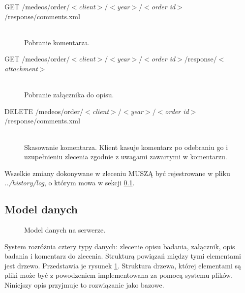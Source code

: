 \documentclass[a4paper]{article}
\begin{document}
\begin{description}
  \item[GET /medeos/order/$<$\emph{client}$>$/$<$\emph{year}$>$/$<$\emph{order id}$>$/response/comments.xml] \hfill \\
  Pobranie komentarza.
  \item[GET /medeos/order/$<$\emph{client}$>$/$<$\emph{year}$>$/$<$\emph{order id}$>$/response/$<$\emph{attachment}$>$] \hfill \\ 
  Pobranie załącznika do opisu.
  \item[DELETE /medeos/order/$<$\emph{client}$>$/$<$\emph{year}$>$/$<$\emph{order id}$>$/response/comments.xml]\hfill \\ 
  Skasowanie komentarza. Klient kasuje komentarz po odebraniu go i uzupełnieniu zlecenia
  zgodnie z uwagami zawartymi w komentarzu.
\end{description}

Wszelkie zmiany dokonywane w zleceniu MUSZĄ być rejestrowane w
pliku \emph{../history/log}, o którym mowa w sekcji \ref{sec:model}. 

\subsection{Model danych}
\label{sec:model}
\begin{figure}
\centering
{}
\caption{\label{fig:modeldanych}Model danych na serwerze.}
\end{figure}

System rozróżnia cztery typy danych: zlecenie opisu badania, załącznik,
opis badania i komentarz do zlecenia. Strukturą powiązań między tymi elementami
jest drzewo. Przedstawia je rysunek \ref{fig:modeldanych}. Struktura drzewa,
której elementami są pliki może być z powodzeniem implementowana za pomocą
systemu plików. Niniejszy opis przyjmuje to rozwiązanie jako bazowe. 
\end{document}
